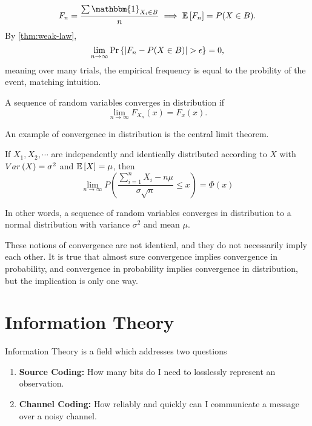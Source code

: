 \[
  F_n = \frac{\sum\mathbbm{1}_{X_i\in B}}{n} \implies \expect{F_n} = P(X \in B).
\]
By \cref{thm:weak-law}, \[
  \lim_{n\to\infty}\text{Pr}\left\{|F_n - P(X\in B)| > \epsilon\right\} = 0,
\]
meaning over many trials, the empirical frequency is equal to the probility of the event, matching intuition.
\begin{definition}
	A sequence of random variables converges in distribution if \[
		\lim_{n\to\infty}F_{X_n}(x) = F_x(x).
	\]
	\label{defn:converge-dist}
\end{definition}
An example of convergence in distribution is the central limit theorem.
\begin{theorem}
	If $X_1, X_2, \cdots$ are independently and identically distributed according to $X$ with $Var\left(X\right) = \sigma^2$ and $\mathbb{E}\left[X\right] = \mu$, then
	\[
		\lim_{n\to\infty}P\left(\frac{\sum_{i=1}^nX_i - n\mu}{\sigma\sqrt{n}} \leq x\right) = \Phi(x)
	\]
	\label{thm:central-limit}
\end{theorem}
In other words, a sequence of random variables converges in distribution to a normal distribution with variance $\sigma^2$ and mean $\mu$.

These notions of convergence are not identical, and they do not necessarily imply each other.
It is true that almost sure convergence implies convergence in probability, and convergence in probability implies convergence in distribution, but the implication is only one way.
\section{Information Theory}
Information Theory is a field which addresses two questions
\begin{enumerate}
	\item \textbf{Source Coding:} How many bits do I need to losslessly represent an observation.
	\item \textbf{Channel Coding:} How reliably and quickly can I communicate a message over a noisy channel.
\end{enumerate}
